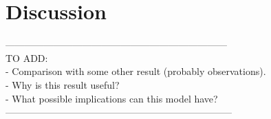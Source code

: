 \setcounter{equation}{0}
\chapter{Discussion}

---------------------------------------------------------------------\\
TO ADD: \\
- Comparison with some other result (probably observations).\\
- Why is this result useful? \\
- What possible implications can this model have?\\
-----------------------------------------------------------------------\\
